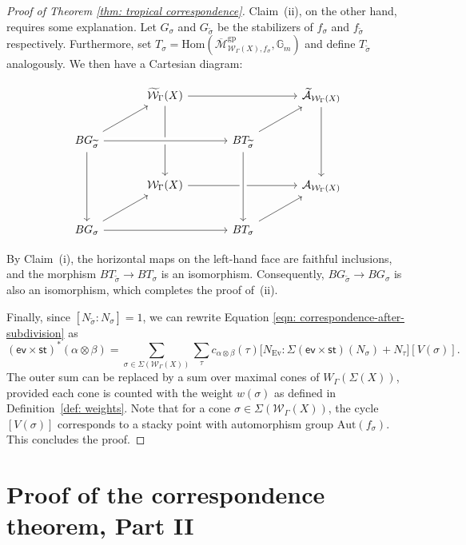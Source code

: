\documentclass{article}
\def\cW{\mathcal{W}}
\begin{document}
\begin{proof}[Proof of  Theorem \ref{thm: tropical correspondence}]
Claim~(ii), on the other hand, requires some explanation. Let $G_\sigma$ and $G_{\widetilde{\sigma}}$ be the stabilizers of $f_\sigma$ and $f_{\widetilde{\sigma}}$ respectively. Furthermore, set $T_{\sigma} = \mathrm{Hom}(\overline{\mathcal{M}}_{\mathcal{W}_{\Gamma}(X), f_{\sigma}}^{\mathrm{gp}}, \mathbb{G}_m)$ and define $T_{\widetilde{\sigma}}$ analogously. We then have a Cartesian diagram:

\[
\begin{tikzcd}[row sep={40,between origins}, column sep={70,between origins}]
      &\widetilde{\cW}_{\Gamma}(X)  \ar{rr}\ar{dd} & & \widetilde{\mathcal{A}}_{\cW_{\Gamma}(X)}\vphantom{\times_{S_1}} \ar{dd} \\
    BG_{\widetilde{\sigma}} \ar[crossing over]{rr} \ar{dd} \ar{ur} & & BT_{\widetilde{\sigma}} \ar{ur} \\
      & \cW_\Gamma(X) \ar{rr} & & \mathcal{A}_{\cW_\Gamma(X)} \vphantom{\times_{S_1}} \\
    BG_\sigma \ar{rr} \ar{ur} &&  BT_\sigma \ar[from=uu,crossing over] \ar{ur}
\end{tikzcd}
\]

By Claim~(i), the horizontal maps on the left-hand face are faithful inclusions, and the morphism $BT_{\widetilde{\sigma}} \to BT_\sigma$ is an isomorphism. Consequently, $BG_{\widetilde{\sigma}} \to BG_\sigma$ is also an isomorphism, which completes the proof of~(ii).


Finally, since $[N_{\widetilde{\sigma}} : N_\sigma] = 1$, we can rewrite Equation \eqref{eqn: correspondence-after-subdivision} as
\[
(\mathsf{ev} \times \mathsf{st})^*( \alpha \otimes \beta) = \sum_{\sigma \in \Sigma(\mathcal{W}_\Gamma(X))} \sum_{\tau} c_{\alpha \otimes \beta}(\tau) \bigl[  N_{\mathrm{Ev}}: \Sigma( \mathsf{ev} \times \mathsf{st})(N_\sigma) + N_\tau  \bigr] [V(\sigma)].
\]
The outer sum can be replaced by a sum over maximal cones of $W_\Gamma(\Sigma(X))$, provided each cone is counted with the weight $w(\sigma)$ as defined in Definition~\ref{def: weights}. Note that for a cone $\sigma \in \Sigma(\mathcal{W}_\Gamma(X))$, the cycle $[V(\sigma)]$ corresponds to a stacky point with automorphism group $\mathrm{Aut}(f_{\sigma})$. This concludes the proof.
\end{proof}





\section{Proof of the correspondence theorem, Part II}\label{sec: weights}
\end{document}
